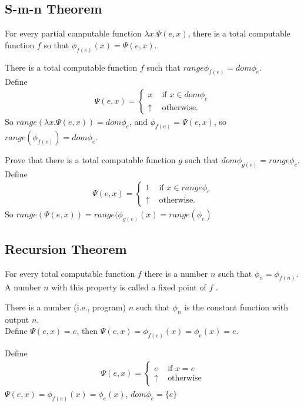 \subsection{S-m-n Theorem}

 For every partial computable function $\lambda x.\Psi(e,x)$,
there is a total computable function $f$ so that $\phi_{f(e)}(x) = \Psi(e,x).$

 There is a total computable function $f$ such that
$range \phi_{f(e)} = dom \phi_e$.\\
Define 
\begin{align*}
  \Psi(e,x)=
  \begin{cases}
    x & \text{ if } x \in dom\phi_e\\
    \uparrow & \text{ otherwise.}
  \end{cases}
\end{align*}
So $range(\lambda x.\Psi(e,x)) = dom\phi_e$, and $\phi_{f(e)}=\Psi(e,x)$, so
$range(\phi_{f(e)}) = dom\phi_e$.

 Prove that there is a total computable function $g$ such that
$dom\phi_{g(e)} = range\phi_e$.\\
Define
\begin{align*}
  \Psi(e,x)=
  \begin{cases}
    1 & \text{ if } x \in range\phi_e\\
    \uparrow & \text{ otherwise.}
  \end{cases}
\end{align*}
So $range(\Psi(e,x)) = range(\phi_{g(e)}(x) = range(\phi_e)$

\subsection{Recursion Theorem}

 For every total computable function $f$ there is a number
$n$
such that $\phi_n = \phi_{f(n)}$. A number $n$ with this property is called a
fixed point of $f$ .

 There is a number (i.e., program) $n$ such that $\phi_n$ is the
constant function with output $n$.\\
Define $\Psi(e,x)=e$, then $\Psi(e,x)=\phi_{f(e)}(x)=\phi_e(x) = e$.

 Define
\begin{align*}
  \Psi(e,x)=
  \begin{cases}
    e & \text{ if } x = e \\
    \uparrow & \text{ otherwise}
  \end{cases}
\end{align*}
$\Psi(e,x)=\phi_{f(e)}(x)=\phi_e(x)$, $dom\phi_e = \{e\}$

